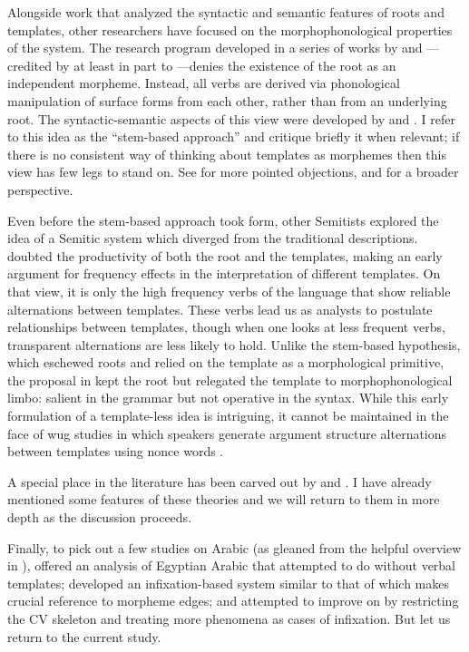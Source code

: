 Alongside work that analyzed the syntactic and semantic features of roots and templates, other researchers have focused on the morphophonological properties of the system. The research program developed in a series of works by \cite{batel89,batel94} and \cite{ussishkin99,ussishkin00phd,ussishkin05}---credited by \cite{ussishkin00phd} at least in part to \cite{horvath81}---denies the existence of the root as an independent morpheme. Instead, all verbs are derived via phonological manipulation of surface forms from each other, rather than from an underlying root. The syntactic-semantic aspects of this view were developed by \cite{reinhartsiloni05} and \cite{laks11,laks13morpho,laks14,laks18}. I refer to this idea as the ``stem-based approach'' and critique briefly it when relevant; if there is no consistent way of thinking about templates as morphemes then this view has few legs to stand on. See \cite{kastner17gjgl,kastner18nllt} for more pointed objections, and \cite{kastnertucker19cup} for a broader perspective.

Even before the stem-based approach took form, other Semitists explored the idea of a Semitic system which diverged from the traditional descriptions. \cite{schwarzwald73} doubted the productivity of both the root and the templates, making an early argument for frequency effects in the interpretation of different templates. On that view, it is only the high frequency verbs of the language that show reliable alternations between templates. These verbs lead us as analysts to postulate relationships between templates, though when one looks at less frequent verbs, transparent alternations are less likely to hold. Unlike the stem-based hypothesis, which eschewed roots and relied on the template as a morphological primitive, the proposal in \cite{schwarzwald73} kept the root but relegated the template to morphophonological limbo: salient in the grammar but not operative in the syntax. While this early formulation of a template-less idea is intriguing, it cannot be maintained in the face of wug studies in which speakers generate argument structure alternations between templates using nonce words \citep{berman93jcl,moorecantwell13}.

A special place in the literature has been carved out by \cite{doron03,doron13voice} and \cite{arad03,arad05}. I have already mentioned some features of these theories and we will return to them in more depth as the discussion proceeds.

Finally, to pick out a few studies on Arabic (as gleaned from the helpful overview in \citealt{ussishkin00phd}), \cite{darden92} offered an analysis of Egyptian Arabic that attempted to do without verbal templates; \cite{mcomber95} developed an infixation-based system similar to that of \cite{jjmcc81} which makes crucial reference to morpheme edges; and \cite{ratcliffe97,ratcliffe98} attempted to improve on \cite{jjmccprince90} by restricting the CV skeleton and treating more phenomena as cases of infixation. But let us return to the current study.

